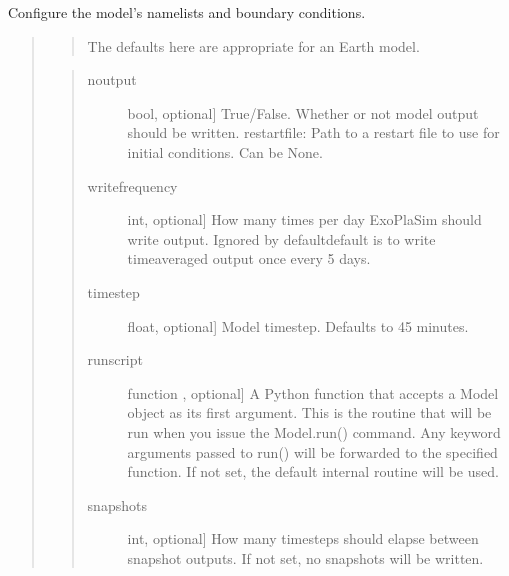 \documentclass[letterpaper,10pt,english]{sphinxmanual}
\begin{document}
\begin{fulllineitems}
\begin{fulllineitems}
\label{\detokenize{source/exoplasim:exoplasim.TLlandplanet.configure}}
Configure the model’s namelists and boundary conditions.
\begin{quote}
\begin{quote}

The defaults here are appropriate for an Earth model.
\end{quote}

\begin{quote}
\begin{description}
\item[{noutput}] \leavevmode{[}bool, optional{]}
True/False. Whether or not model output should be written.
restartfile: Path to a restart file to use for initial conditions. Can be None.

\item[{writefrequency}] \leavevmode{[}int, optional{]}
How many times per day ExoPlaSim should write output. Ignored by
default\textendash{}default is to write time\sphinxhyphen{}averaged output once every 5 days.

\item[{timestep}] \leavevmode{[}float, optional{]}
Model timestep. Defaults to 45 minutes.

\item[{runscript}] \leavevmode{[}function , optional{]}
A Python function that accepts a Model object as its first argument. This
is the routine that will be run when you issue the Model.run() command.
Any keyword arguments passed to run() will be forwarded to the specified
function. If not set, the default internal routine will be used.

\item[{snapshots}] \leavevmode{[}int, optional{]}
How many timesteps should elapse between snapshot outputs. If not set,
no snapshots will be written.


\end{description}
\end{quote}
\end{quote}
\end{fulllineitems}
\end{fulllineitems}
\end{document}
